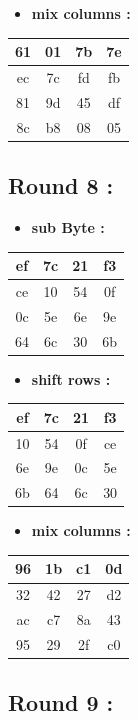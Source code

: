\documentclass{article}
\begin{document}
\begin{itemize}
    \item \textbf{mix columns :}
\end{itemize} \begin{tabular}{|c|c|c|c|}
\hline 61 & 01 & 7b & 7e \\ \hline ec & 7c & fd & fb \\ \hline 81 & 9d & 45 & df \\ \hline 8c & b8 & 08 & 05 \\ \hline \end{tabular}\hspace{0.5cm}\vspace{0.1cm}\subsection*{Round 8 : }\begin{itemize}
    \item \textbf{sub Byte :}
\end{itemize} \begin{tabular}{|c|c|c|c|}
\hline ef & 7c & 21 & f3 \\ \hline ce & 10 & 54 & 0f \\ \hline 0c & 5e & 6e & 9e \\ \hline 64 & 6c & 30 & 6b \\ \hline \end{tabular}\hspace{0.5cm}\vspace{0.1cm}\begin{itemize}
    \item \textbf{shift rows :}
\end{itemize} \begin{tabular}{|c|c|c|c|}
\hline ef & 7c & 21 & f3 \\ \hline 10 & 54 & 0f & ce \\ \hline 6e & 9e & 0c & 5e \\ \hline 6b & 64 & 6c & 30 \\ \hline \end{tabular}\hspace{0.5cm}\vspace{0.1cm}\begin{itemize}
    \item \textbf{mix columns :}
\end{itemize} \begin{tabular}{|c|c|c|c|}
\hline 96 & 1b & c1 & 0d \\ \hline 32 & 42 & 27 & d2 \\ \hline ac & c7 & 8a & 43 \\ \hline 95 & 29 & 2f & c0 \\ \hline \end{tabular}\hspace{0.5cm}\vspace{0.1cm}\subsection*{Round 9 : }\begin{itemize}

\end{itemize}
\end{document}
